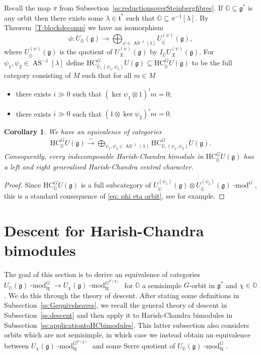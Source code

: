 \documentclass[twoside,12pt,reqno]{amsart}
\newtheorem{Corollary}[Theorem]{Corollary}
\theoremstyle{remark}
\numberwithin{equation}{section}
\def\isoto{\overset{\sim}{\longrightarrow}}
\def\lmod{\!\operatorname{-mod}}
\def\O{{\mathbb O}}
\def\cO{{\overline{\mathbb O}}}
\def\HC{\mathrm{HC}}
\def\g{{\mathfrak g}}
\def\t{\mathfrak t}
\newcommand{\AS}{\operatorname{AS}}
\newcommand{\fg}{\operatorname{fg}}
\begin{document}
Recall the map $\pi$ from Subsection~\ref{ss:reductionsoverSteinbergfibres}. If $\O \subseteq \g^*$ is any orbit then there exists some $\lambda \in \t^*$ such that $\O \subseteq \pi^{-1}[\lambda]$. By Theorem~\ref{T:blockdecomp} we have an isomorphism
\begin{equation} \label{eq: phi eta orbit}
    \phi \colon U_{\overline\O}(\g) \to \bigoplus_{\psi \in \AS^{-1}[\lambda]} U_{\overline\O}^{(\psi)}(\g),
\end{equation}
where $U_{\overline\O}^{(\psi)}(\g)$ is the quotient of $U_{X}^{(\psi)}(\g)$ by $I_{\overline\O}U_{X}^{(\psi)}(\g)$. For $\psi_1, \psi_2 \in \AS^{-1}[\lambda]$ define $\HC_{\overline\O, (\psi_1, \psi_2)}^G U(\g) \subseteq \HC_{\overline\O}^G U(\g)$ to be the full category consisting of $M$ such that for all $m\in M$
\begin{itemize}
    \item[(i)] there exists $i\gg 0$ such that $(\ker \psi_1 \otimes 1)^i m = 0$;
    \item[(ii)] there exists $i\gg 0$ such that $(1\otimes \ker \psi_2)^im = 0$.
\end{itemize}
\begin{Corollary}
\label{C:centralcharactersindecomposable}
    We have an equivalence of categories
    \begin{eqnarray}
        \HC_{\overline\O}^G U(\g) \isoto \bigoplus_{\psi_1, \psi_2 \in \AS^{-1}(\lambda)} \HC_{\overline\O, (\psi_1, \psi_2)}^G U(\g).
    \end{eqnarray}
    Consequently, every indecomposable Harish-Chandra bimodule in $\HC_\cO^G U(\g)$ has a left and right generalised Harish-Chandra central character.
\end{Corollary}
\begin{proof}
    Since $\HC_{\overline\O}^G U(\g)$ is a full subcategory of $U_{\overline\O}^{(\psi_1)}(\g) \otimes U_{\overline\O}^{(\psi_2)}(\g)\lmod^G$, this is a standard consequence of \eqref{eq: phi eta orbit}, see \cite[II.5]{ARS} for example.
\end{proof}





\section{Descent for Harish-Chandra bimodules}
\label{S:descent}

The goal of this section is to derive an equivalence of categories $U_\O(\g)\lmod^G_{\fg}\to U_\chi(\g)\lmod^{G^{F(\chi)}}_{\fg}$ for $\O$ a semisimple $G$-orbit in $\g^*$ and $\chi\in\O$. We do this through the theory of descent. After stating some definitions in Subsection~\ref{ss:Gequivsheaves}, we recall the general theory of descent in Subsection~\ref{ss:descent} and then apply it to Harish-Chandra bimodules in Subsection~\ref{ss:applicationtoHCbimodules}. This latter subsection also considers orbits which are not semisimple, in which case we instead obtain an equivalence between $U_\chi(\g)\lmod^{G^{F(\chi)}}_{\fg}$ and some Serre quotient of $U_\cO(\g)\lmod^G_{\fg}$.
\end{document}
